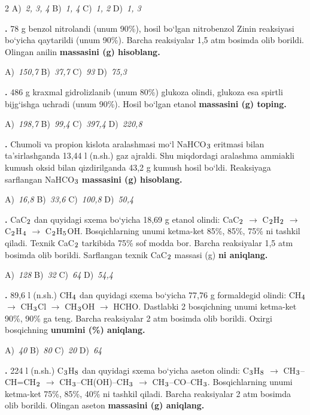 \documentclass[11pt,a4paper]{article}
\renewcommand{\textsubscript}[1]{\ensuremath{_{\text{\fontsize{8}{8}\selectfont #1}}}}
\newcommand{\qn}[1]{\textbf{\fontsize{11.5}{13}\selectfont #1}}
\newcommand{\qsep}{\par\vspace{13pt}}
\begin{document}
\begin{multicols}{2}
\noindent A)~\textsl{2, 3, 4} \hfill B)~\textsl{1, 4} \hfill C)~\textsl{1, 2} \hfill D)~\textsl{1, 3}\par
\qsep
\noindent\qn{24.} 78 g benzol nitrolandi (unum 90\%), hosil bo`lgan nitrobenzol Zinin reaksiyasi bo`yicha qaytarildi (unum 90\%). Barcha reaksiyalar 1,5 atm bosimda olib borildi. Olingan anilin \textbf{massasini (g) hisoblang.}

\noindent A)~\textsl{150,7} \hfill B)~\textsl{37,7} \hfill C)~\textsl{93} \hfill D)~\textsl{75,3}\par
\qsep
\noindent\qn{25.} 486 g kraxmal gidrolizlanib (unum 80\%) glukoza olindi, glukoza esa spirtli bijg`ishga uchradi (unum 90\%). Hosil bo`lgan etanol \textbf{massasini (g) toping.}

\noindent A)~\textsl{198,7} \hfill B)~\textsl{99,4} \hfill C)~\textsl{397,4} \hfill D)~\textsl{220,8}\par
\qsep
\noindent\qn{26.} Chumoli va propion kislota aralashmasi mo`l NaHCO\textsubscript{3} eritmasi bilan ta'sirlashganda 13,44 l (n.sh.) gaz ajraldi. Shu miqdordagi aralashma ammiakli kumush oksid bilan qizdirilganda 43,2 g kumush hosil bo`ldi. Reaksiyaga sarflangan NaHCO\textsubscript{3} \textbf{massasini (g) hisoblang.}

\noindent A)~\textsl{16,8} \hfill B)~\textsl{33,6} \hfill C)~\textsl{100,8} \hfill D)~\textsl{50,4}\par
\qsep
\noindent\qn{27.} CaC\textsubscript{2} dan quyidagi sxema bo`yicha 18,69 g etanol olindi: CaC\textsubscript{2} $\to$ C\textsubscript{2}H\textsubscript{2} $\to$ C\textsubscript{2}H\textsubscript{4} $\to$ C\textsubscript{2}H\textsubscript{5}OH. Bosqichlarning unumi ketma-ket 85\%, 85\%, 75\% ni tashkil qiladi. Texnik CaC\textsubscript{2} tarkibida 75\% sof modda bor. Barcha reaksiyalar 1,5 atm bosimda olib borildi. Sarflangan texnik CaC\textsubscript{2} massasi (g) \textbf{ni aniqlang.}

\noindent A)~\textsl{128} \hfill B)~\textsl{32} \hfill C)~\textsl{64} \hfill D)~\textsl{54,4}\par
\qsep
\noindent\qn{28.} 89,6 l (n.sh.) CH\textsubscript{4} dan quyidagi sxema bo`yicha 77,76 g formaldegid olindi: CH\textsubscript{4} $\to$ CH\textsubscript{3}Cl $\to$ CH\textsubscript{3}OH $\to$ HCHO. Dastlabki 2 bosqichning unumi ketma-ket 90\%, 90\% ga teng. Barcha reaksiyalar 2 atm bosimda olib borildi. Oxirgi bosqichning \textbf{unumini (\%) aniqlang.}

\noindent A)~\textsl{40} \hfill B)~\textsl{80} \hfill C)~\textsl{20} \hfill D)~\textsl{64}\par
\qsep
\noindent\qn{29.} 224 l (n.sh.) C\textsubscript{3}H\textsubscript{8} dan quyidagi sxema bo`yicha aseton olindi: C\textsubscript{3}H\textsubscript{8} $\to$ CH\textsubscript{3}--CH=CH\textsubscript{2} $\to$ CH\textsubscript{3}--CH(OH)--CH\textsubscript{3} $\to$ CH\textsubscript{3}--CO--CH\textsubscript{3}. Bosqichlarning unumi ketma-ket 75\%, 85\%, 40\% ni tashkil qiladi. Barcha reaksiyalar 2 atm bosimda olib borildi. Olingan aseton \textbf{massasini (g) aniqlang.}


\end{multicols}
\end{document}

